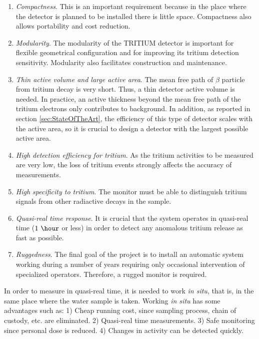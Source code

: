\begin{enumerate}

\item{} \textit{Compactness}. This is an important requirement because in the place where the detector is planned to be installed there is little space. Compactness also allows portability and cost reduction.

\item{} \textit{Modularity}. The modularity of the TRITIUM detector is important for flexible geometrical configuration and for improving its tritium detection sensitivity. Modularity also facilitates construction and maintenance.

\item{} \textit{Thin active volume and large active area}. The mean free path of $\beta$ particle from tritium decay is very short. Thus, a thin detector active volume is needed. In practice, an active thickness beyond the mean free path of the tritium electrons only contributes to background. In addition, as reported in section \ref{sec:StateOfTheArt}, the efficiency of this type of detector scales with the active area, so it is crucial to design a detector with the largest possible active area.

\item{} \textit{High detection efficiency for tritium}. As the tritium activities to be measured are very low, the loss of tritium events strongly affects the accuracy of measurements.

\item{} \textit{High specificity to tritium}. The monitor must be able to distinguish tritium signals from other radiactive decays in the sample.

\item{} \textit{Quasi-real time response}. It is crucial that the system operates in quasi-real time ($1~\hour$ or less) in order to detect any anomalous tritium release as fast as possible. 

\item{} \textit{Ruggedness}. The final goal of the project is to install an automatic system working during a number of years requiring only occasional intervention of specialized operators. Therefore, a rugged monitor is required.

\end{enumerate}

In order to measure in quasi-real time, it is needed to work \textit{in situ}, that is, in the same place where the water sample is taken. Working \textit{in situ} has some advantages such as: 1) Cheap running cost, since sampling process, chain of custody, etc. are eliminated. 2) Quasi-real time measurements. 3) Safe monitoring since personal dose is reduced. 4) Changes in activity can be detected quickly.


